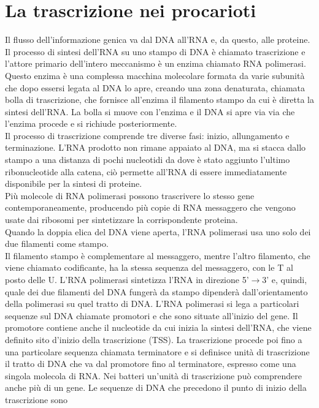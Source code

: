 \documentclass{article}
\begin{document}
\section{La trascrizione nei procarioti}
Il flusso dell'informazione genica va dal DNA all'RNA e, da questo, alle proteine. Il processo di sintesi dell'RNA su uno stampo di DNA è chiamato trascrizione e l'attore primario dell'intero meccanismo è un enzima chiamato RNA
polimerasi. Questo enzima è una complessa macchina molecolare formata da
varie subunità che dopo essersi legata al DNA lo apre, creando una zona denaturata, chiamata bolla di trascrizione, che fornisce all'enzima il filamento stampo
da cui è diretta la sintesi dell'RNA. La bolla si muove con l'enzima e il DNA si
apre via via che l'enzima procede e si richiude posteriormente.\\
Il processo di trascrizione comprende tre diverse
fasi: inizio, allungamento e terminazione. L'RNA prodotto non rimane appaiato al
DNA, ma si stacca dallo stampo a una distanza di pochi nucleotidi da dove è stato
aggiunto l'ultimo ribonucleotide alla catena, ciò permette all'RNA di essere immediatamente disponibile per la sintesi di proteine.\\
Più molecole di RNA polimerasi possono trascrivere lo stesso gene contemporaneamente, producendo
più copie di RNA messaggero che vengono usate dai ribosomi per sintetizzare
la corrispondente proteina. \\
Quando la doppia elica del DNA viene aperta, l'RNA polimerasi usa uno solo dei
due filamenti come stampo.\\
Il filamento stampo è complementare al messaggero, mentre l'altro filamento,
che viene chiamato codificante, ha la stessa sequenza del messaggero, con le T al
posto delle U. L'RNA polimerasi sintetizza l'RNA in direzione 5'$\rightarrow$3' e, quindi,
quale dei due filamenti del DNA fungerà da stampo dipenderà dall'orientamento
della polimerasi su quel tratto di DNA.
L'RNA polimerasi si lega a particolari sequenze sul DNA chiamate promotori e
che sono situate all'inizio del gene. Il promotore contiene anche il nucleotide da cui
inizia la sintesi dell'RNA, che viene definito sito d'inizio della trascrizione (TSS).
La trascrizione procede poi fino a una particolare sequenza chiamata terminatore
e si definisce unità di trascrizione il tratto di DNA che va dal promotore fino al
terminatore, espresso come una singola molecola di RNA. Nei batteri
un'unità di trascrizione può comprendere anche più di un gene.
Le sequenze di DNA che precedono il punto di inizio della trascrizione sono
\end{document}
